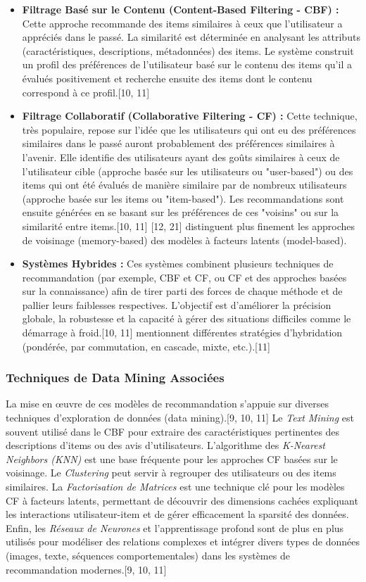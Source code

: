 \documentclass[11pt,a4paper]{article}
\begin{document}
\begin{itemize}
    \item \textbf{Filtrage Basé sur le Contenu (Content-Based Filtering - CBF) :} Cette approche recommande des items similaires à ceux que l'utilisateur a appréciés dans le passé. La similarité est déterminée en analysant les attributs (caractéristiques, descriptions, métadonnées) des items. Le système construit un profil des préférences de l'utilisateur basé sur le contenu des items qu'il a évalués positivement et recherche ensuite des items dont le contenu correspond à ce profil.[10, 11]
    \item \textbf{Filtrage Collaboratif (Collaborative Filtering - CF) :} Cette technique, très populaire, repose sur l'idée que les utilisateurs qui ont eu des préférences similaires dans le passé auront probablement des préférences similaires à l'avenir. Elle identifie des utilisateurs ayant des goûts similaires à ceux de l'utilisateur cible (approche basée sur les utilisateurs ou "user-based") ou des items qui ont été évalués de manière similaire par de nombreux utilisateurs (approche basée sur les items ou "item-based"). Les recommandations sont ensuite générées en se basant sur les préférences de ces "voisins" ou sur la similarité entre items.[10, 11] \citet{Koren2011} [12, 21] distinguent plus finement les approches de voisinage (memory-based) des modèles à facteurs latents (model-based).
    \item \textbf{Systèmes Hybrides :} Ces systèmes combinent plusieurs techniques de recommandation (par exemple, CBF et CF, ou CF et des approches basées sur la connaissance) afin de tirer parti des forces de chaque méthode et de pallier leurs faiblesses respectives. L'objectif est d'améliorer la précision globale, la robustesse et la capacité à gérer des situations difficiles comme le démarrage à froid.[10, 11] \citet{Ko2022} mentionnent différentes stratégies d'hybridation (pondérée, par commutation, en cascade, mixte, etc.).[11]
\end{itemize}

\subsubsection{Techniques de Data Mining Associées}
La mise en œuvre de ces modèles de recommandation s'appuie sur diverses techniques d'exploration de données (data mining).[9, 10, 11] Le \textit{Text Mining} est souvent utilisé dans le CBF pour extraire des caractéristiques pertinentes des descriptions d'items ou des avis d'utilisateurs. L'algorithme des \textit{K-Nearest Neighbors (KNN)} est une base fréquente pour les approches CF basées sur le voisinage. Le \textit{Clustering} peut servir à regrouper des utilisateurs ou des items similaires. La \textit{Factorisation de Matrices} est une technique clé pour les modèles CF à facteurs latents, permettant de découvrir des dimensions cachées expliquant les interactions utilisateur-item et de gérer efficacement la sparsité des données. Enfin, les \textit{Réseaux de Neurones} et l'apprentissage profond sont de plus en plus utilisés pour modéliser des relations complexes et intégrer divers types de données (images, texte, séquences comportementales) dans les systèmes de recommandation modernes.[9, 10, 11]
\end{document}
